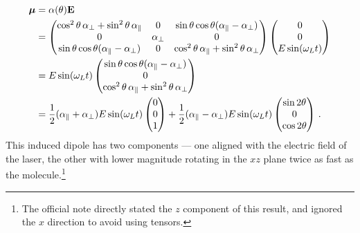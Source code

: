 \documentclass{article}
\theoremstyle{plain}\theoremheaderfont{\normalfont\itshape}\theorembodyfont{\rmfamily}\theoremseparator{.}\newtheorem*{rem}{Remark}\newtheorem*{ex}{Example}\newtheorem*{proof}{Proof}\newtheorem*{altp}{Alternative proof}
\theoremstyle{plain}\theoremheaderfont{\normalfont\bfseries}\theorembodyfont{\rmfamily}\theoremseparator{.}\newtheorem{thm}{Theorem}[section]\newtheorem{lem}[thm]{Lemma}\newtheorem{prop}[thm]{Proposition}\newtheorem*{cor}{Corollary}\newtheorem{defn}[thm]{Definition}\newtheorem{clm}[thm]{Claim}\newtheorem{clminproof}{Claim}\newtheorem{pos}{Postulate}[section]
\theoremstyle{break}\theoremheaderfont{\normalfont\itshape}\theorembodyfont{\rmfamily}\theoremseparator{.\medskip}\newtheorem*{proofskip}{Proof}\newtheorem*{exs}{Examples}\newtheorem*{rems}{Remarks}
\theoremstyle{break}\theoremheaderfont{\normalfont\bfseries}\theorembodyfont{\rmfamily}\theoremseparator{.\medskip}\newtheorem{lemskip}[thm]{Lemma}\newtheorem{defnskip}[thm]{Definition}\newtheorem{propskip}[thm]{Proposition}\newtheorem{thmskip}[thm]{Theorem}
\numberwithin{equation}{section}
\newcommand{\vb}[1]{\bm{\mathrm{#1}}}
\begin{document}
    \begin{align}
        \vb{\mu}&=\alpha(\theta)\vb{E}\notag\\
        &=\begin{pmatrix}
            \cos^2\theta\,\alpha_\perp+\sin^2\theta\,\alpha_\parallel & 0 & \sin\theta\cos\theta(\alpha_\parallel-\alpha_\perp) \\
            0 & \alpha_\perp & 0 \\
            \sin\theta\cos\theta(\alpha_\parallel-\alpha_\perp) & 0 & \cos^2\theta\,\alpha_\parallel+\sin^2\theta\,\alpha_\perp
        \end{pmatrix}\begin{pmatrix}
            0 \\ 0 \\ E\sin(\omega_L t)
        \end{pmatrix}\notag\\
        &=E\sin(\omega_L t)\begin{pmatrix}
            \sin\theta\cos\theta(\alpha_\parallel-\alpha_\perp) \\
            0 \\
            \cos^2\theta\,\alpha_\parallel+\sin^2\theta\,\alpha_\perp
        \end{pmatrix}\notag\\
        &=\frac{1}{2}(\alpha_\parallel+\alpha_\perp)E\sin(\omega_L t)\begin{pmatrix}
            0 \\ 0 \\ 1
        \end{pmatrix}+\frac{1}{2}(\alpha_{\parallel}-\alpha_{\perp}) E\sin(\omega_L t)\begin{pmatrix}
            \sin 2\theta \\ 0 \\ \cos 2\theta
        \end{pmatrix}\,.
    \end{align}
    This induced dipole has two components --- one aligned with the electric field of the laser, the other with lower magnitude rotating in the \(xz\) plane twice as fast as the molecule.\footnote{The official note directly stated the \(z\) component of this result, and ignored the \(x\) direction to avoid using tensors.}
\end{document}
